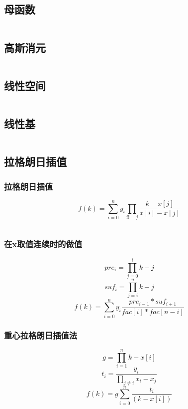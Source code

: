 \documentclass[a4paper,11pt]{article}
\begin{document}
\subsection{母函数} 
\inputminted[breaklines]{c++}{数论/母函数.cpp} 

\subsection{高斯消元} 
\inputminted[breaklines]{c++}{数论/高斯消元.cpp} 

\subsection{线性空间} 
\inputminted[breaklines]{c++}{数论/线性空间.cpp}

\subsection{线性基} 
\inputminted[breaklines]{c++}{数论/线性基.cpp}

\subsection{拉格朗日插值}
\subsubsection{拉格朗日插值}
\begin{displaymath}
f(k) = \sum_{i = 0}^{n}y_i\prod_{i != j}^{}\frac{k - x[j]}{x[i] - x[j]}
\end{displaymath}
\inputminted[breaklines]{c++}{数论/拉格朗日插值.cpp}

\subsubsection{在x取值连续时的做值}
\begin{displaymath}
pre_i = \prod_{j = 0}^{i} k - j
\end{displaymath}
\begin{displaymath}
suf_i = \prod_{j = i}^n k - j
\end{displaymath}
\begin{displaymath}
f(k) = \sum_{i=0}^n y_i \frac{pre_{i-1} * suf_{i+1}}{fac[i] * fac[n - i]}
\end{displaymath}

\subsubsection{重心拉格朗日插值法}
\begin{displaymath}
g = \prod_{i=1}^n k - x[i]
\end{displaymath}
\begin{displaymath}
t_i = \frac{y_i}{\prod_{j \not =i} x_i - x_j}
\end{displaymath}
\begin{displaymath}
f(k) = g\sum_{i = 0}^{n}  \frac{t_i}{(k - x[i])}
\end{displaymath}
\inputminted[breaklines]{c++}{数论/重心拉格朗日插值法.cpp}
\end{document}
